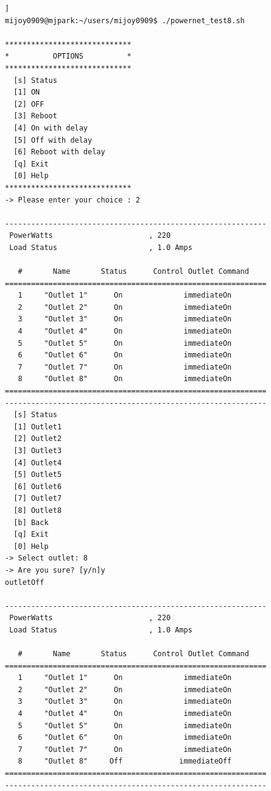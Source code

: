 \documentclass[11pt
  , a4paper
  , article
  , oneside
]{memoir}
\begin{document}
\begin{lstlisting}[style=termstyle, caption=APC PDU 모니터링 및 제어결과]]
mijoy0909@mjpark:~/users/mijoy0909$ ./powernet_test8.sh

*****************************
*          OPTIONS          *
*****************************
  [s] Status                 
  [1] ON                     
  [2] OFF                    
  [3] Reboot                 
  [4] On with delay          
  [5] Off with delay         
  [6] Reboot with delay      
  [q] Exit                   
  [0] Help                   
*****************************
-> Please enter your choice : 2

------------------------------------------------------------
 PowerWatts                      , 220
 Load Status                     , 1.0 Amps

   #       Name       Status      Control Outlet Command
============================================================
   1     "Outlet 1"      On              immediateOn
   2     "Outlet 2"      On              immediateOn
   3     "Outlet 3"      On              immediateOn
   4     "Outlet 4"      On              immediateOn
   5     "Outlet 5"      On              immediateOn
   6     "Outlet 6"      On              immediateOn
   7     "Outlet 7"      On              immediateOn
   8     "Outlet 8"      On              immediateOn
============================================================
------------------------------------------------------------
  [s] Status                 
  [1] Outlet1                
  [2] Outlet2                
  [3] Outlet3                
  [4] Outlet4                
  [5] Outlet5                
  [6] Outlet6                
  [7] Outlet7                
  [8] Outlet8                
  [b] Back                   
  [q] Exit                   
  [0] Help                   
-> Select outlet: 8
-> Are you sure? [y/n]y
outletOff

------------------------------------------------------------
 PowerWatts                      , 220
 Load Status                     , 1.0 Amps

   #       Name       Status      Control Outlet Command
============================================================
   1     "Outlet 1"      On              immediateOn
   2     "Outlet 2"      On              immediateOn
   3     "Outlet 3"      On              immediateOn
   4     "Outlet 4"      On              immediateOn
   5     "Outlet 5"      On              immediateOn
   6     "Outlet 6"      On              immediateOn
   7     "Outlet 7"      On              immediateOn
   8     "Outlet 8"     Off             immediateOff
============================================================
------------------------------------------------------------
\end{lstlisting}
\end{document}
